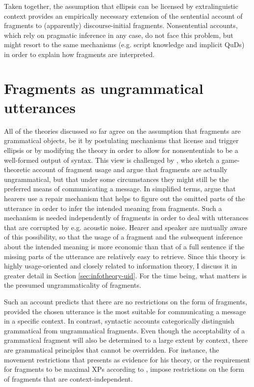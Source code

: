 \largerpage
Taken together, the assumption that ellipsis can be licensed by extralinguistic context provides an empirically necessary extension of the sentential account of fragments to (apparently) discourse-initial fragments. Nonsentential accounts, which rely on pragmatic inference in any case, do not face this problem, but might resort to the same mechanisms (e.g. script knowledge and implicit QuDs) in order to explain how fragments are interpreted.


\section{Fragments as ungrammatical utterances}  \label{sec:theories-ungrammatical}

All of the theories discussed so far agree on the assumption that fragments are grammatical objects, be it by postulating mechanisms that license and trigger ellipsis or by modifying the theory in order to allow for nonsententials to be a well-formed output of syntax. This view is challenged by \citet{bergen.goodman2015}, who sketch a game-theoretic account of fragment usage and argue that fragments are actually ungrammatical, but that under some circumstances they might still be the preferred means of communicating a message. In simplified terms, \citeauthor{bergen.goodman2015} argue that hearers use a repair mechanism that helps to figure out the omitted parts of the utterance in order to infer the intended meaning from fragments. Such a mechanism is needed independently of fragments in order to deal with utterances that are corrupted by e.g. acoustic noise. Hearer and speaker are mutually aware of this possibility, so that the usage of a fragment and the subsequent inference about the intended meaning is more economic than that of a full sentence if the missing parts of the utterance are relatively easy to retrieve. Since this theory is highly usage-oriented and closely related to information theory, I discuss it in greater detail in Section \ref{sec:infotheory-uid}. For the time being, what matters is the presumed ungrammaticality of fragments.

Such an account predicts that there are no restrictions on the form of fragments, provided the chosen utterance is the most suitable for communicating a message in a specific context. In contrast, syntactic accounts categorically distinguish grammatical from ungrammatical fragments. Even though the acceptability of a grammatical fragment will also be determined to a large extent by context, there are grammatical principles that cannot be overridden. For instance, the movement restrictions that \citet{merchant2004} presents as evidence for his theory, or the requirement for fragments to be maximal XPs according to \citet{barton.progovac2005}, impose restrictions on the form of fragments that are context-independent.

